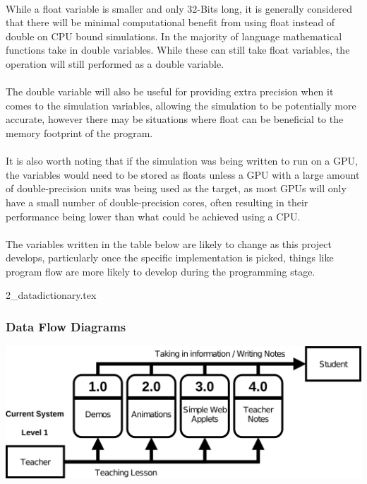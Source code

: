 \paragraph{} 
While a float variable is smaller and only 32-Bits long, it is generally considered that there will be minimal computational benefit from using float instead of double on CPU bound simulations. In the majority of language mathematical functions take in double variables. While these can still take float variables, the operation will still performed as a double variable.

\paragraph{}
The double variable will also be useful for providing extra precision when it comes to the simulation variables, allowing the simulation to be potentially more accurate, however there may be situations where float can be beneficial to the memory footprint of the program.

\paragraph{}
It is also worth noting that if the simulation was being written to run on a GPU, the variables would need to be stored as floats unless a GPU with a large amount of double-precision units was being used as the target, as most GPUs will only have a small number of double-precision cores, often resulting in their performance being lower than what could be achieved using a CPU.

\paragraph{}
The variables written in the table below are likely to change as this project develops, particularly once the specific implementation is picked, things like program flow are more likely to develop during the programming stage.

{2_datadictionary.tex}

\pagebreak

\subsubsection{Data Flow Diagrams}
\includegraphics{img/csl1.png}

